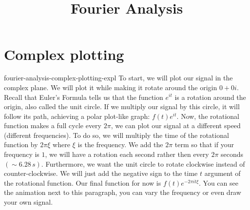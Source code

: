 \documentclass[preview]{standalone}
\begin{document}
\title{Fourier Analysis}
\genpage

\section{Complex plotting}

\begin{snippet}{fourier-analysis-complex-plotting-expl}
    To start, we will plot our signal in the complex plane.
    We will plot it while making it rotate around the origin \(0+0i\).
    Recall that Euler's Formula tells us that the function \(e^{it}\) is a rotation
    around the origin, also called the unit circle. If we multiply our signal by this circle,
    it will follow its path, achieving a polar plot-like graph: \(f(t)e^{it}\).
    Now, the rotational function makes a full cycle every \(2\pi\), we can plot our
    signal at a different speed (different frequencies). To do so, we will multiply
    the time of the rotational function by \(2\pi \xi\) where \(\xi\) is the frequency.
    We add the \(2\pi\) term so that if your frequency is \(1\), we will have a rotation each second
    rather then every \(2\pi\) seconds \((\sim 6.28\,s)\).
    Furthermore, we want the unit circle to rotate clockwise instead of counter-clockwise.
    We will just add the negative sign to the time \(t\) argument of the rotational function.
    Our final function for now is \(f(t)e^{-2\pi it\xi}\). You can see the animation next
    to this paragraph, you can vary the frequency or even draw your own signal.
\end{snippet}

\end{document}
